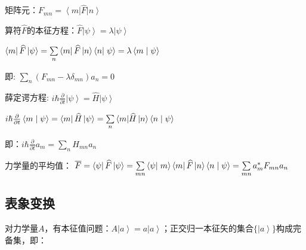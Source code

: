\begin{description}
矩阵元：$F_{mn}  = \left\langle m \right|\widehat F\left| n \right\rangle $


算符$\hat F$的本征方程：$\widehat F\left| \psi  \right\rangle  = \lambda \left| \psi  \right\rangle $


$\left\langle m \right|\widehat F\left| \psi  \right\rangle  = \sum\limits_n {\left\langle m \right|\widehat F\left| n \right\rangle \left\langle n \right|\left. \psi  \right\rangle }  = \lambda \left\langle {m}
 \mathrel{\left | {\vphantom {m \psi }}
 \right. \kern-\nulldelimiterspace}
 {\psi } \right\rangle $


即: $\sum\limits_n {\left( {F_{mn}  - \lambda \delta _{mn} }
\right)a_n }  = 0$

薛定谔方程: $i\hbar \frac{\partial }{{\partial t}}\left| \psi
\right\rangle  = \widehat H\left| \psi  \right\rangle $


$i\hbar \frac{\partial }{{\partial t}}\left\langle {m}
 \mathrel{\left | {\vphantom {m \psi }}
 \right. \kern-\nulldelimiterspace}
 {\psi } \right\rangle  = \left\langle m \right|\widehat H\left| \psi  \right\rangle  = \sum\limits_n {\left\langle m \right|} \widehat H\left| n \right\rangle \left\langle {n}
 \mathrel{\left | {\vphantom {n \psi }}
 \right. \kern-\nulldelimiterspace}
 {\psi } \right\rangle $



即：$i\hbar \frac{\partial }{{\partial t}}a_m  = \sum\limits_n {H_{mn} a_n } $


力学量的平均值： $\overline F  = \left\langle \psi  \right|\widehat F\left| \psi  \right\rangle  = \sum\limits_{mn} {\left\langle \psi  \right|} \left. m \right\rangle \left\langle m \right|\widehat F\left| n \right\rangle \left\langle {n}
 \mathrel{\left | {\vphantom {n \psi }}
 \right. \kern-\nulldelimiterspace}
 {\psi } \right\rangle  = \sum\limits_{mn} {a_m^* F_{mn} a_n } $

   \end{description}


\subsection{表象变换}


对力学量$A$，有本征值问题：$A \left| a \right\rangle = a \left| a
\right\rangle$；正交归一本征矢的集合$\{ \left| a \right\rangle
\}$构成完备集，即：

